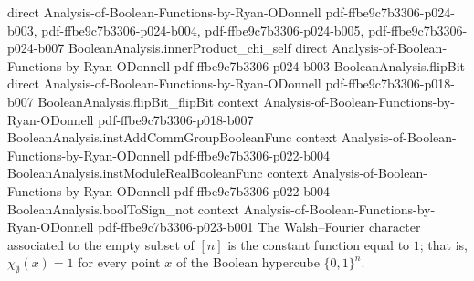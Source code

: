 \begin{lemma}
  {direct}
  {Analysis-of-Boolean-Functions-by-Ryan-ODonnell}
  {pdf-ffbe9c7b3306-p024-b003,
    pdf-ffbe9c7b3306-p024-b004,
    pdf-ffbe9c7b3306-p024-b005,
    pdf-ffbe9c7b3306-p024-b007}
\proofstep
  {BooleanAnalysis.innerProduct_chi_self}
  {direct}
  {Analysis-of-Boolean-Functions-by-Ryan-ODonnell}
  {pdf-ffbe9c7b3306-p024-b003}
\proofstep
  {BooleanAnalysis.flipBit}
  {direct}
  {Analysis-of-Boolean-Functions-by-Ryan-ODonnell}
  {pdf-ffbe9c7b3306-p018-b007}
\proofstep
  {BooleanAnalysis.flipBit_flipBit}
  {context}
  {Analysis-of-Boolean-Functions-by-Ryan-ODonnell}
  {pdf-ffbe9c7b3306-p018-b007}
\proofstep
  {BooleanAnalysis.instAddCommGroupBooleanFunc}
  {context}
  {Analysis-of-Boolean-Functions-by-Ryan-ODonnell}
  {pdf-ffbe9c7b3306-p022-b004}
\proofstep
  {BooleanAnalysis.instModuleRealBooleanFunc}
  {context}
  {Analysis-of-Boolean-Functions-by-Ryan-ODonnell}
  {pdf-ffbe9c7b3306-p022-b004}
\proofstep
  {BooleanAnalysis.boolToSign_not}
  {context}
  {Analysis-of-Boolean-Functions-by-Ryan-ODonnell}
  {pdf-ffbe9c7b3306-p023-b001}
The Walsh–Fourier character associated to the empty subset of $[n]$ is the constant
function equal to $1$; that is, $\chi_\emptyset(x) = 1$ for every point $x$ of the
Boolean hypercube $\{0,1\}^n$.
\end{lemma}


